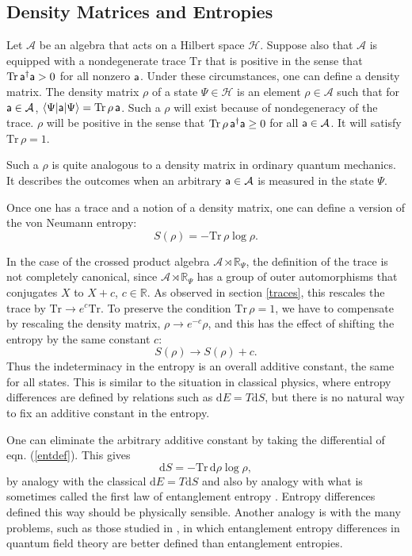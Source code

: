 \documentclass[11pt,a4paper]{article}
\def\a{{\sf a}}
\def\be{\begin{equation}}
\def\ee{\end{equation}}
\def\A{{\mathcal A}}
\def\d{{\mathrm d}}
\def\R{{\mathbb R}}
\def\la{\langle}
\def\ra{\rangle}
\def\H{{\mathcal H}}
\def\Tr{\mathrm{Tr}}
\begin{document}
\subsection{Density Matrices and Entropies}\label{entropy}

Let $\A$ be an  algebra that acts on a Hilbert space $\H$.  Suppose also that
$\A$ is equipped with a nondegenerate  trace $\Tr$ that is positive in the sense that $\Tr\,\a^\dagger\a>0$ for all nonzero $\a$.
Under these circumstances, one can define a density matrix.   The density matrix $\rho$ of a state $\Psi\in\H$ is an element $\rho\in \A$ 
such that for $\a\in\A$, $\la\Psi|\a|\Psi\ra=\Tr\,\rho\,\a$.   Such a $\rho$ will exist because of nondegeneracy of the trace.   $\rho$ will be positive
in the sense that $\Tr\,\rho\,\a^\dagger \a\geq 0$ for all $\a\in \A$.  It will satisfy $\Tr\,\rho=1$.

Such a $\rho$ is quite analogous to a density matrix in ordinary quantum mechanics.   It describes the outcomes when an arbitrary $\a\in\A$
is measured  in the state $\Psi$.


Once one has a trace and a notion of a density matrix, one can define a version of the von Neumann entropy:
\be\label{entdef}S(\rho)=-\Tr\,\rho\log\rho. \ee


In the case of the crossed product algebra $\A\rtimes \R_\Psi$, the definition of the trace is not completely canonical, since $\A\rtimes \R_\Psi$
has a group of outer automorphisms that conjugates $X$ to $X+c$, $c\in \R$.   As observed in section \ref{traces}, this rescales the trace by
$\Tr\to e^c\Tr$.   To preserve the condition $\Tr\,\rho=1$, we have to compensate by rescaling the density matrix, $\rho\to e^{-c}\rho$,
and this has the effect of shifting the entropy by the same constant $c$:
\be\label{shiftentropy} S(\rho)\to S(\rho)+c. \ee
Thus the indeterminacy in the entropy is an overall additive constant, the same for all states.  This is similar to the situation in classical physics, 
where entropy differences are defined
by relations such as $\d E = T\d S$, but there is no natural way to fix an additive constant in the entropy.

One can eliminate the arbitrary additive constant by taking the differential of eqn. (\ref{entdef}).  This gives
\be\label{nudef}\d S=-\Tr\,\d\rho \log\rho,\ee
by analogy with the classical $\d E=T\d S$ and also by analogy with what is sometimes called the first law of entanglement entropy \cite{BCHM}.
Entropy differences defined this way should be physically sensible.
 Another analogy is with the many problems, such as those studied in \cite{CH,Casini},
  in which entanglement entropy differences in quantum field theory are better defined
 than entanglement entropies.
\end{document}
